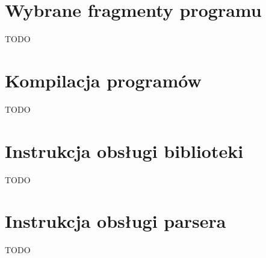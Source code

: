 \documentclass{standalone}
\begin{document}
\appendix

\chapter{Wybrane fragmenty programu}

TODO

\chapter{Kompilacja programów}

TODO

\chapter{Instrukcja obsługi biblioteki}

TODO

\chapter{Instrukcja obsługi parsera}

TODO
\end{document}
